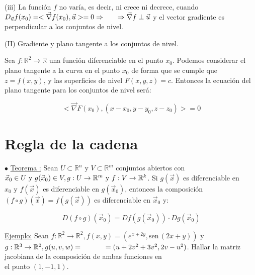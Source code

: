 \documentclass[10pt, titlepage]{article}
\newcommand{\R}{\mathbb{R}}
\newcommand{\teorema}[1][\!\!]{\noindent$\bullet$ \underline{Teorema #1:} }
\newcommand{\dindent}{\indent\indent}
\newcommand{\sen}[1]{\text{sen}\,{#1}}
\begin{document}
(iii) La función $f$ no varía, es decir, ni crece ni decrece, cuando $D_{\vec{u}} f (x_0) = < \vec{\nabla} f 
(x_0), \vec{u} > = 0 \Rightarrow \\ \indent \Rightarrow \vec{\nabla} f \perp \vec{u}$ y el vector gradiente 
es perpendicular a los conjuntos de nivel.
\vspace{5mm}


\noindent (II) Gradiente y plano tangente a los conjuntos de nivel.
\vspace{3mm}

Sea $f : \R^2 \to \R$ una función diferenciable en el punto $x_0$. Podemos considerar el plano tangente a 
la \indent curva en el punto $x_0$ de forma que se cumple que $z = f (x, y)$, y las superficies de nivel 
$F (x, y, z) = c$. \indent Entonces la ecuación del plano tangente para los conjuntos de nivel será:
\vspace{3mm}

\[
\boxed{
< \vec{\nabla} F (x_0), (x - x_0, y - y_0, z - z_0) > = 0
}
\]
\vspace{7mm}


\section{Regla de la cadena}
\vspace{5mm}

\teorema Sean $U \subset \R^n \text{ y } V \subset \R^m$ conjuntos abiertos con $\vec{x}_0 \in U 
\text{ y } g (\vec{x}_0) \in V, g : U \to \R^m \text{ y } \\ f  : V \to \R^k$. Si $g (\vec{x})$ es diferenciable 
en $x_0 \text{ y } f (\vec{x})$ es diferenciable en $g (\vec{x}_0)$, entonces la composición $(f \circ g) 
(\vec{x}) = f (g (\vec{x}))$ es diferenciable en $\vec{x}_0$ y:
\vspace{3mm}

\[
\boxed{
D (f \circ g) (\vec{x}_0) = Df (g (\vec{x}_0)) \cdot Dg (\vec{x}_0)
}
\]
\vspace{7mm}

\dindent\underline{Ejemplo:} Sean $f : \R^2 \to \R^2, f (x, y) = (e^{x + 2y}, \sen{(2x + y)})$ y 
$g : \R^3 \to \R^2, g (u, v, w) = \\ \dindent = (u + 2v^2 + 3v^2, 2v - u^2)$. Hallar la matriz jacobiana de
la composición de ambas funciones en \\ \dindent el punto $(1, -1, 1)$.
\vspace{3mm}
\end{document}
